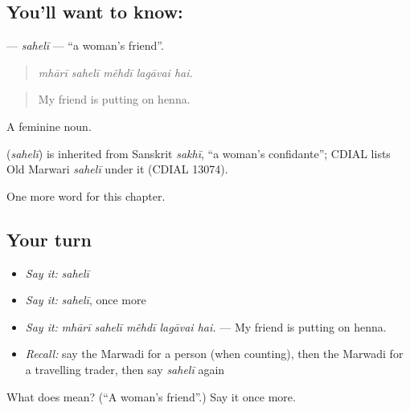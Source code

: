 \subsection*{You'll want to know: }
\textbf{} — \emph{sahelī} — \textquotedblleft{}a woman's friend\textquotedblright{}.

\begin{quote}
    
\end{quote}

\begin{quote}
\emph{mhārī sahelī mẽhdī lagāvai hai.}
\end{quote}

\begin{quote}
My friend is putting on henna.
\end{quote}

A feminine noun.

\begin{cousinweb}
\textbf{} (\emph{sahelī}) is inherited from Sanskrit \emph{sakhī}, \textquotedblleft{}a woman's confidante\textquotedblright{}; CDIAL lists Old Marwari \emph{sahelī} under it (CDIAL 13074).
\end{cousinweb}

\begin{grammarlens}[title={What you've built}]
One more word for this chapter.
\end{grammarlens}

\subsection*{Your turn}
\begin{itemize}
\raggedright
  \item \emph{Say it:} \emph{sahelī}
  \item \emph{Say it:} \emph{sahelī}, once more
  \item \emph{Say it:} \emph{mhārī sahelī mẽhdī lagāvai hai.} — My friend is putting on henna.
  \item \emph{Recall:} say the Marwadi for a person (when counting), then the Marwadi for a travelling trader, then say \emph{sahelī} again
\end{itemize}

\begin{tcolorbox}[breakable,colback=teal!4,colframe=teal!35!black,title={Before you move on}]
What does  mean? (\textquotedblleft{}A woman's friend\textquotedblright{}.) Say it once more.
\end{tcolorbox}
